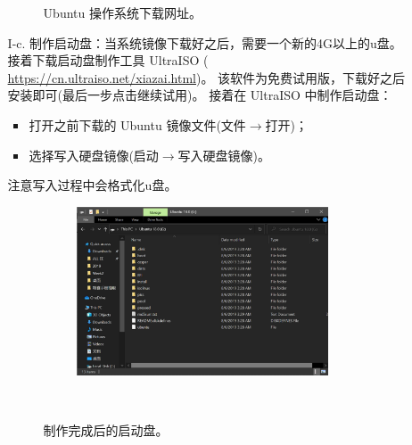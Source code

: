 \begin{itemize}
\begin{itemize}
\begin{figure}[htbp]
					\caption{Ubuntu 操作系统下载网址。}
					\label{fig:ubuntuDown}
				\end{figure}
			\item [I-c.] 制作启动盘：当系统镜像下载好之后，需要一个新的4G以上的u盘。
				接着下载启动盘制作工具 UltraISO ( \url{https://cn.ultraiso.net/xiazai.html})。
				该软件为免费试用版，下载好之后安装即可(最后一步点击继续试用)。
				接着在 UltraISO 中制作启动盘：
				\begin{itemize}
					\item 打开之前下载的 Ubuntu 镜像文件(文件$\to$打开)；
					\item 选择写入硬盘镜像(启动$\to$写入硬盘镜像)。
				\end{itemize}
				注意写入过程中会格式化u盘。
			　	\begin{figure}[htbp]
			　		\centering
			　		\includegraphics[width=0.75\textwidth]{png/UltraISO}
			　		\caption{制作完成后的启动盘。}
			　		\label{fig:UltraISO}
			　	\end{figure}
		\end{itemize}


\end{itemize}
